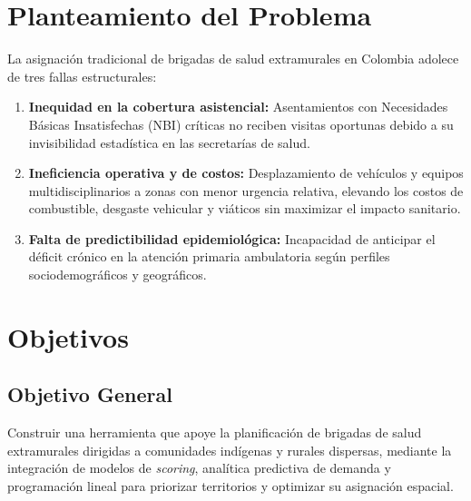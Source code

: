 \documentclass[12pt]{article}
\begin{document}
\section{Planteamiento del Problema}
La asignación tradicional de brigadas de salud extramurales en Colombia adolece de tres fallas estructurales:
\begin{enumerate}[label=\alph*)]
    \item \textbf{Inequidad en la cobertura asistencial:} Asentamientos con Necesidades Básicas Insatisfechas (NBI) críticas no reciben visitas oportunas debido a su invisibilidad estadística en las secretarías de salud.
    \item \textbf{Ineficiencia operativa y de costos:} Desplazamiento de vehículos y equipos multidisciplinarios a zonas con menor urgencia relativa, elevando los costos de combustible, desgaste vehicular y viáticos sin maximizar el impacto sanitario.
    \item \textbf{Falta de predictibilidad epidemiológica:} Incapacidad de anticipar el déficit crónico en la atención primaria ambulatoria según perfiles sociodemográficos y geográficos.
\end{enumerate}

\section{Objetivos}

\subsection{Objetivo General}
Construir una herramienta que apoye la planificación de brigadas de salud extramurales dirigidas a comunidades indígenas y rurales dispersas, mediante la integración de modelos de \textit{scoring}, analítica predictiva de demanda y programación lineal para priorizar territorios y optimizar su asignación espacial.
\end{document}
